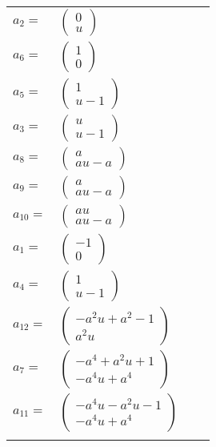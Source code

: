 \documentclass[1p]{elsarticle_modified}
\theoremstyle{definition}
\begin{document}
\begin{tabular}{m{7pt} m{180pt} m{7pt} m{180pt} }
\flushright $a_{2}=$&$\begin{pmatrix}0\\u\end{pmatrix}$ \\
\flushright $a_{6}=$&$\begin{pmatrix}1\\0\end{pmatrix}$ \\
\flushright $a_{5}=$&$\begin{pmatrix}1\\u-1\end{pmatrix}$ \\
\flushright $a_{3}=$&$\begin{pmatrix}u\\u-1\end{pmatrix}$ \\
\flushright $a_{8}=$&$\begin{pmatrix}a\\a u- a\end{pmatrix}$ \\
\flushright $a_{9}=$&$\begin{pmatrix}a\\a u- a\end{pmatrix}$ \\
\flushright $a_{10}=$&$\begin{pmatrix}a u\\a u- a\end{pmatrix}$ \\
\flushright $a_{1}=$&$\begin{pmatrix}-1\\0\end{pmatrix}$ \\
\flushright $a_{4}=$&$\begin{pmatrix}1\\u-1\end{pmatrix}$ \\
\flushright $a_{12}=$&$\begin{pmatrix}- a^2 u+a^2-1\\a^2 u\end{pmatrix}$ \\
\flushright $a_{7}=$&$\begin{pmatrix}- a^4+a^2 u+1\\- a^4 u+a^4\end{pmatrix}$ \\
\flushright $a_{11}=$&$\begin{pmatrix}- a^4 u- a^2 u-1\\- a^4 u+a^4\end{pmatrix}$\\&\end{tabular}
\end{document}
